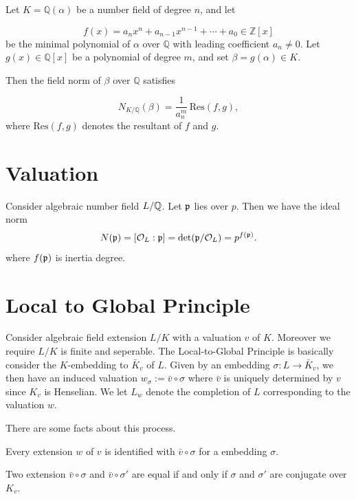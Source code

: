 {\begin{theorem}
Let $K = \mathbb{Q}(\alpha)$ be a number field of degree $n$, and let

\[
f(x) = a_n x^n + a_{n-1} x^{n-1} + \cdots + a_0 \in \mathbb{Z}[x]
\]
be the minimal polynomial of $\alpha$ over $\mathbb{Q}$ with leading coefficient $a_n \neq 0$.
Let $g(x) \in \mathbb{Q}[x]$ be a polynomial of degree $m$, and set $\beta = g(\alpha) \in K$.

Then the field norm of $\beta$ over $\mathbb{Q}$ satisfies

\[
N_{K/\mathbb{Q}}(\beta) = \frac{1}{a_n^m} \,\mathrm{Res}(f, g),
\]
where $\mathrm{Res}(f, g)$ denotes the resultant of $f$ and $g$.
\end{theorem}



\section*{Valuation}




\np Consider algebraic number field $L/\mathbb{Q}$. Let $\mathfrak{p}$ lies over $p$. Then we have the ideal norm
\begin{align*}
    N(\mathfrak{p}) = [\mathcal{O}_L:\mathfrak{p}] = \operatorname{det}(\mathfrak{p}/\mathcal{O}_L) = p^{f(\mathfrak{p})}.
\end{align*}
where $f(\mathfrak{p})$ is inertia degree.

\section*{Local to Global Principle}

Consider algebraic field extension $L/K$ with a valuation $v$ of $K$.
Moreover we require $L/K$ is finite and seperable.
The Local-to-Global Principle is basically consider the $K$-embedding to $\bar{K}_v$ of $L$.
Given by an embedding $\sigma:L\to \bar{K}_v$, we then have an induced valuation $w_{\sigma}:=\bar{v}\circ\sigma$ where $\bar{v}$ is uniquely determined by $v$ since $K_v$ is Henselian.
We let $L_{w}$ denote the completion of $L$ corresponding to the valuation $w$.


There are some facts about this process.

\np Every extension $w$ of $v$ is identified with $\bar{v}\circ \sigma$ for a embedding $\sigma$.

\np Two extension $\bar{v}\circ \sigma$ and $\bar{v}\circ \sigma'$ are equal if and only if $\sigma$ and $\sigma'$ are conjugate over $K_v$.

}
